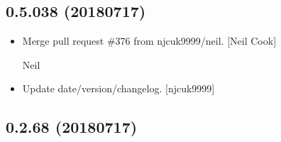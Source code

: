 \documentclass[a4paper,10pt,english]{report}
\begin{document}
\subsection{0.5.038 (2018\sphinxhyphen{}07\sphinxhyphen{}17)}
\label{\detokenize{misc/changelog:id409}}\begin{itemize}
\item {} 
Merge pull request \#376 from njcuk9999/neil. {[}Neil Cook{]}

Neil

\item {} 
Update date/version/changelog. {[}njcuk9999{]}

\end{itemize}


\subsection{0.2.68 (2018\sphinxhyphen{}07\sphinxhyphen{}17)}
\end{document}
